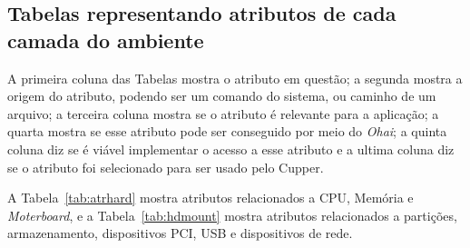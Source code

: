 \begin{apendicesenv}

\partapendices

\chapter[Tabelas de cada camada]{Tabelas representando atributos de cada camada do ambiente}
\label{apc:tabelas}

A primeira coluna das Tabelas mostra o atributo em questão; a segunda mostra
a origem do atributo, podendo ser um comando do sistema, ou caminho de um arquivo;
a terceira coluna mostra se o atributo é relevante para a aplicação; a quarta mostra se
esse atributo pode ser conseguido por meio do \textit{Ohai}; a quinta coluna 
diz se é viável implementar o acesso a esse atributo e a ultima coluna
diz se o atributo foi selecionado para ser usado pelo Cupper. 

A Tabela~\ref{tab:atrhard} mostra atributos relacionados a CPU, Memória e 
\textit{Moterboard}, e a Tabela~\ref{tab:hdmount} mostra atributos relacionados
a partições, armazenamento, dispositivos PCI, USB e dispositivos de rede.


\end{apendicesenv}
